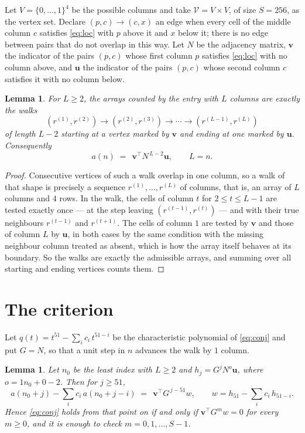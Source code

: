 \documentclass[11pt,a4paper]{article}
\theoremstyle{plain}
\newtheorem{lemma}[theorem]{Lemma}
\theoremstyle{definition}
\begin{document}
Let $V=\{0,\dots,1\}^{4}$ be the possible columns and take
$\mathcal V=V\times V$, of size $S=256$, as the vertex set. Declare $(p,c)\to(c,x)$ an edge
when every cell of the middle column $c$ satisfies \eqref{eq:loc} with $p$ above it and $x$
below it; there is no edge between pairs that do not overlap in this way. Let $N$ be the
adjacency matrix, $\mathbf{v}$ the indicator of the pairs $(p,c)$ whose first column $p$
satisfies \eqref{eq:loc} with no column above, and $\mathbf{u}$ the indicator of
the pairs $(p,c)$ whose second column $c$ satisfies it with no column below.

\begin{lemma}\label{lem:walk}
For $L\ge2$, the arrays counted by the entry with $L$ columns are exactly the walks
\[
(r^{(1)},r^{(2)})\to(r^{(2)},r^{(3)})\to\cdots\to(r^{(L-1)},r^{(L)})
\]
of length $L-2$ starting at a vertex marked by $\mathbf{v}$ and ending at one marked by
$\mathbf{u}$. Consequently
\[
a(n)\;=\;\,\mathbf{v}^{\!\top}N^{\,L-2}\mathbf{u},\qquad L=n .
\]
\end{lemma}

\begin{proof}
Consecutive vertices of such a walk overlap in one column, so a walk of that shape is
precisely a sequence $r^{(1)},\dots,r^{(L)}$ of columns, that is, an array of $L$ columns
and $4$ rows. In the walk, the cells of column $t$ for $2\le t\le L-1$ are tested
exactly once --- at the step leaving $(r^{(t-1)},r^{(t)})$ --- and with their true
neighbours $r^{(t-1)}$ and $r^{(t+1)}$. The cells of column $1$ are tested by
$\mathbf{v}$ and those of column $L$ by $\mathbf{u}$, in both cases by the same condition
with the missing neighbour column treated as absent, which is how the array itself behaves at
its boundary. So the walks are exactly the admissible arrays, and summing over all starting
and ending vertices counts them.
\end{proof}

\section{The criterion}

Let $q(t)=t^{51}-\sum_i c_i\,t^{51-i}$ be the characteristic polynomial of
\eqref{eq:conj} and put $G=N$, so that a unit step in $n$ advances the walk by
$1$ column.

\begin{lemma}\label{lem:crit}
Let $n_0$ be the least index with $L\ge2$ and $h_j=G^{j}N^{o}\mathbf{u}$, where
$o=1n_0+0-2$. Then for $j\ge51$,
\[
a(n_0+j)-\sum_i c_i\,a(n_0+j-i)\;=\;\,\mathbf{v}^{\!\top}G^{\,j-51}w,
\qquad w=h_{51}-\sum_i c_i\,h_{51-i} .
\]
Hence \eqref{eq:conj} holds from that point on if and only if
$\mathbf{v}^{\!\top}G^{m}w=0$ for every $m\ge0$, and it is enough to check
$m=0,1,\dots,S-1$.
\end{lemma}
\end{document}
